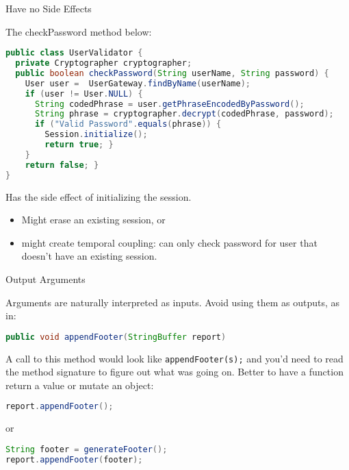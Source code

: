 \documentclass{beamer}
\begin{document}
\begin{frame}[fragile]{Have no Side Effects}


The checkPassword method below:
\begin{lstlisting}[language=Java]
public class UserValidator {
  private Cryptographer cryptographer;
  public boolean checkPassword(String userName, String password) {
    User user =  UserGateway.findByName(userName);
    if (user != User.NULL) {
      String codedPhrase = user.getPhraseEncodedByPassword();
      String phrase = cryptographer.decrypt(codedPhrase, password);
      if ("Valid Password".equals(phrase)) {
        Session.initialize();
        return true; }
    }
    return false; }
}
\end{lstlisting}
Has the side effect of initializing the session.
\begin{itemize}
\item Might erase an existing session, or
\item might create temporal coupling: can only check password for user that doesn't have an existing session.
\end{itemize}


\end{frame}

\begin{frame}[fragile]{Output Arguments}


Arguments are naturally interpreted as inputs.  Avoid using them as outputs, as in:
\begin{lstlisting}[language=Java]
public void appendFooter(StringBuffer report)
\end{lstlisting}
A call to this method would look like {\tt appendFooter(s);} and you'd need to read the method signature to figure out what was going on.  Better to have a function return a value or mutate an object:
\begin{lstlisting}[language=Java]
report.appendFooter();
\end{lstlisting}
or
\begin{lstlisting}[language=Java]
String footer = generateFooter();
report.appendFooter(footer);
\end{lstlisting}

\end{frame}
\end{document}
